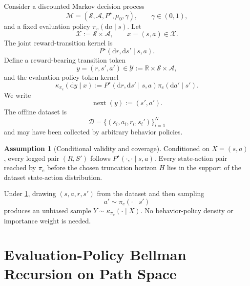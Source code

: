 \documentclass[11pt]{article}
\theoremstyle{definition}
\newtheorem{assumption}[theorem]{Assumption}
\theoremstyle{remark}
\newcommand{\Sspace}{\mathcal S}
\newcommand{\Aspace}{\mathcal A}
\newcommand{\Xspace}{\mathcal X}
\newcommand{\Yspace}{\mathcal Y}
\newcommand{\R}{\mathbb R}
\newcommand{\nextx}{\operatorname{next}}
\newcommand{\dd}{\mathrm d}
\newcommand{\targetpi}{\pi_e}
\begin{document}
Consider a discounted Markov decision process
\begin{equation}
\mathcal M
=
(\Sspace,\Aspace,P^\star,\mu_0,\gamma),
\qquad
\gamma\in(0,1),
\label{eq:mdp}
\end{equation}
and a fixed evaluation policy $\targetpi(\dd a\mid s)$. Let
\begin{equation}
\Xspace:=\Sspace\times\Aspace,
\qquad
x=(s,a)\in\Xspace.
\end{equation}
The joint reward-transition kernel is
\begin{equation}
P^\star(\dd r,\dd s'\mid s,a).
\label{eq:environment-kernel}
\end{equation}
Define a reward-bearing transition token
\begin{equation}
y=(r,s',a')\in
\Yspace:=\R\times\Sspace\times\Aspace,
\end{equation}
and the evaluation-policy token kernel
\begin{equation}
\boxed{
\kappa_{\targetpi}(\dd y\mid x)
:=
P^\star(\dd r,\dd s'\mid s,a)
\targetpi(\dd a'\mid s').
}
\label{eq:token-kernel}
\end{equation}
We write
\begin{equation}
\nextx(y):=(s',a').
\end{equation}
The offline dataset is
\begin{equation}
\mathcal D
=
\{(s_i,a_i,r_i,s_i')\}_{i=1}^N
\end{equation}
and may have been collected by arbitrary behavior policies.

\begin{assumption}[Conditional validity and coverage]
\label{ass:coverage}
Conditioned on $X=(s,a)$, every logged pair $(R,S')$ follows
$P^\star(\cdot,\cdot\mid s,a)$. Every state-action pair reached by
$\targetpi$ before the chosen truncation horizon $H$ lies in the support of
the dataset state-action distribution.
\end{assumption}

Under \cref{ass:coverage}, drawing $(s,a,r,s')$ from the dataset and then
sampling
\begin{equation}
a'\sim\targetpi(\cdot\mid s')
\end{equation}
produces an unbiased sample $Y\sim\kappa_{\targetpi}(\cdot\mid X)$. No
behavior-policy density or importance weight is needed.

\section{Evaluation-Policy Bellman Recursion on Path Space}
\label{sec:path-flow}
\end{document}
